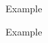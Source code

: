 \documentclass[ngerman]{exercises}
\begin{document}
    \begin{exercise}[Example]
        Example

        \begin{solution}
            Example
        \end{solution}
    \end{exercise}
\end{document}
